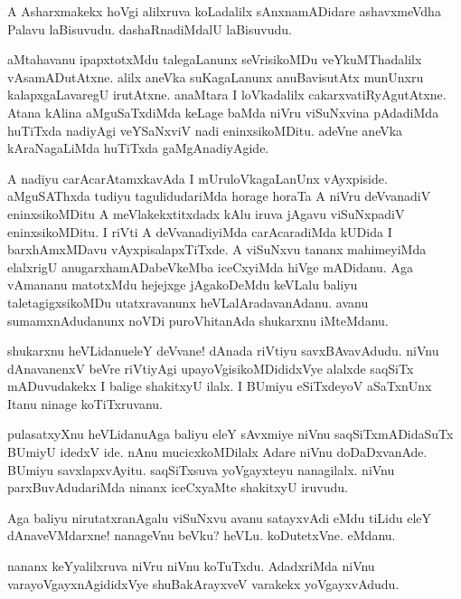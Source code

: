 \begin{mng}
A Asharxmakekx hoVgi alilxruva koLadalilx sAnxnamADidare ashavxmeVdha Palavu laBisuvudu. dashaRnadiMdalU laBisuvudu.
\end{mng}

\begin{mng}
aMtahavanu ipapxtotxMdu talegaLanunx seVrisikoMDu veYkuMThadalilx vAsamADutAtxne. alilx aneVka suKagaLanunx anuBavisutAtx munUnxru kalapxgaLavaregU irutAtxne. anaMtara I loVkadalilx cakarxvatiRyAgutAtxne. Atana kAlina aMguSaTxdiMda keLage baMda niVru viSuNxvina pAdadiMda huTiTxda nadiyAgi veYSaNxviV nadi eninxsikoMDitu. adeVne aneVka kAraNagaLiMda huTiTxda gaMgAnadiyAgide.
\end{mng}

\begin{mng}
A nadiyu carAcarAtamxkavAda I mUruloVkagaLanUnx vAyxpiside. aMguSAThxda tudiyu tagulidudariMda horage horaTa A niVru deVvanadiV eninxsikoMDitu A meVlakekxtitxdadx kAlu iruva jAgavu viSuNxpadiV eninxsikoMDitu. I riVti A deVvanadiyiMda carAcaradiMda kUDida I barxhAmxMDavu vAyxpisalapxTiTxde. A viSuNxvu tananx mahimeyiMda elalxrigU anugarxhamADabeVkeMba iceCxyiMda hiVge mADidanu. Aga vAmananu matotxMdu hejejxge jAgakoDeMdu keVLalu baliyu taletagigxsikoMDu utatxravanunx heVLalAradavanAdanu. avanu sumamxnAdudanunx noVDi puroVhitanAda shukarxnu iMteMdanu.
\end{mng}

\begin{mng}
shukarxnu heVLidanu\mdash eleY deVvane! dAnada riVtiyu savxBAvavAdudu. niVnu dAnavanenxV beVre riVtiyAgi upayoVgisikoMDididxVye alalxde saqSiTx mADuvudakekx I balige shakitxyU ilalx. I BUmiyu eSiTxdeyoV aSaTxnUnx Itanu ninage koTiTxruvanu.
\end{mng}

\begin{mng}
pulasatxyXnu heVLidanu\mdash Aga baliyu eleY sAvxmiye niVnu saqSiTxmADidaSuTx BUmiyU idedxV ide. nAnu mucicxkoMDilalx Adare niVnu doDaDxvanAde. BUmiyu savxlapxvAyitu. saqSiTxsuva yoVgayxteyu nanagilalx. niVnu parxBuvAdudariMda ninanx iceCxyaMte shakitxyU iruvudu.
\end{mng}

\begin{mng}
Aga baliyu nirutatxranAgalu viSuNxvu avanu satayxvAdi eMdu tiLidu eleY dAnaveVMdarxne! nanageVnu beVku? heVLu. koDutetxVne. eMdanu.
\end{mng}

\begin{mng}
nananx keYyalilxruva niVru niVnu koTuTxdu. AdadxriMda niVnu varayoVgayxnAgididxVye shuBakArayxveV varakekx yoVgayxvAdudu.
\end{mng}

